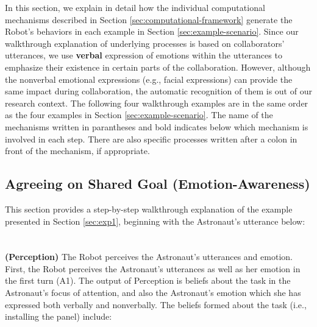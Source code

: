 In this section, we explain in detail how the individual computational
mechanisms described in Section \ref{sec:computational-framework} generate the
Robot's behaviors in each example in Section \ref{sec:example-scenario}. Since
our walkthrough explanation of underlying processes is based on collaborators'
utterances, we use \textbf{verbal} expression of emotions within the utterances
to emphasize their existence in certain parts of the collaboration. However,
although the nonverbal emotional expressions (e.g., facial expressions) can
provide the same impact during collaboration, the automatic recognition of them
is out of our research context. The following four walkthrough examples are in
the same order as the four examples in Section \ref{sec:example-scenario}. The
name of the mechanisms written in parantheses and bold indicates below which
mechanism is involved in each step. There are also specific processes written
after a colon in front of the mechanism, if appropriate.

\subsection{Agreeing on Shared Goal (Emotion-Awareness)}
\label{sec:wt-exp1}

This section provides a step-by-step walkthrough explanation of the example
presented in Section \ref{sec:exp1}, beginning with the Astronaut's utterance
below:\\

\noindent{}\\ \\

\noindent \textbf{(Perception)} The Robot perceives the Astronaut's utterances
and emotion.\\
  
First, the Robot perceives the Astronaut's utterances as well as her emotion in
the first turn (A1). The output of Perception is beliefs about the task in the
Astronaut's focus of attention, and also the Astronaut's emotion which she has
expressed both verbally and nonverbally. The beliefs formed about the task
(i.e., installing the panel) include:

